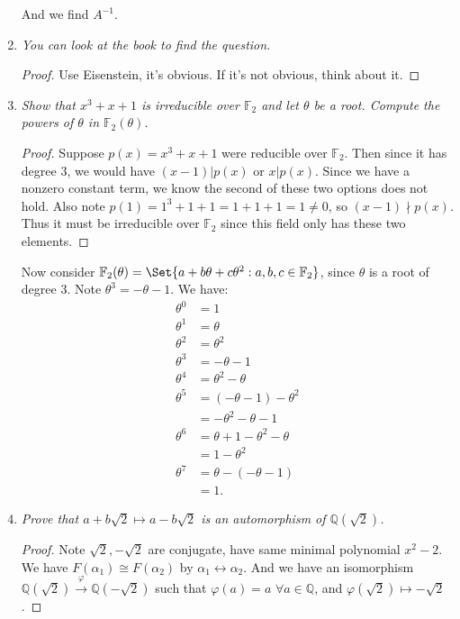 \documentclass[9pt,reqno,twoside]{amsbook}
\theoremstyle{plain}
\numberwithin{section}{chapter}
\numberwithin{equation}{chapter}
\theoremstyle{definition}
\theoremstyle{remark}
\theoremstyle{plain}
\newcommand{\Q}{\mathbb{Q}}
\newcommand{\F}{\mathbb{F}}
\newcommand{\bb}{\vspace{3mm}}
\newcommand{\bee}{\begin{equation}\begin{aligned}}
\newcommand{\eee}{\end{aligned}\end{equation}}
\renewcommand{\phi}{\varphi}
\begin{document}
\begin{enumerate}[label=\arabic*.]
And we find $A^{-1}$. 

\item \textit{You can look at the book to find the question. }

\begin{proof}
Use Eisenstein, it's obvious. If it's not obvious, think about it. 
\end{proof}

\setcounter{enumi}{2}

\item \textit{Show that $x^3 + x + 1$ is irreducible over $\mathbb{F}_2$ and let $\theta$ be a root. Compute the powers of $\theta$ in $\mathbb{F}_2(\theta)$. } 

\begin{proof}
Suppose $p(x) = x^3 + x + 1$ were reducible over $\F_2$. Then since it has degree $3$, we would have $(x - 1)|p(x)$ or $x|p(x)$. Since we have a nonzero constant term, we know the second of these two options does not hold. Also note $p(1) = 1^3 + 1 + 1 = 1 + 1 + 1 = 1 \neq 0$, so $(x - 1) \nmid p(x)$. Thus it must be irreducible over $\F_2$ since this field only has these two elements. 
\end{proof}

Now consider $\F_2(\theta) = \Set{a + b\theta + c\theta^2: a,b,c \in \F_2}$, since $\theta$ is a root of degree 3. Note $\theta^3 = -\theta - 1$. We have:
\bee
\theta^0 &= 1\\
\theta^1 &= \theta\\
\theta^2 &= \theta^2\\
\theta^3 &= -\theta - 1\\
\theta^4 &= \theta^2 - \theta\\
\theta^5 &= (-\theta - 1) - \theta^2\\
&= -\theta^2 - \theta - 1\\
\theta^6 &= \theta + 1 - \theta^2 - \theta\\
&= 1 - \theta^2\\
\theta^7 &= \theta - (-\theta - 1)\\
&= 1.
\eee


\bb


\item \textit{Prove that $a + b\sqrt{2} \mapsto a - b \sqrt{2}$ is an automorphism of $\Q(\sqrt{2})$. }

\begin{proof}
Note $\sqrt{2},-\sqrt{2}$ are conjugate, have same minimal polynomial $x^2 - 2$. We have $F(\alpha_1) \cong F(\alpha_2)$ by $\alpha_1 \leftrightarrow \alpha_2$. And we have an isomorphism $\Q(\sqrt{2}) \overset{\phi}{\to} \Q(-\sqrt{2})$ such that $\phi(a) = a$ $\forall a \in \Q$, and $\phi(\sqrt{2}) \mapsto -\sqrt{2}$.


\end{proof}
\end{enumerate}
\end{document}
